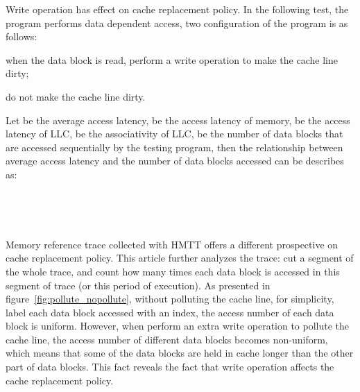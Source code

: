 \documentclass[conference]{IEEEtran}
\begin{document}
Write operation has effect on cache replacement policy. In the following test, the program performs data dependent access, two configuration of the program is as follows:
\begin{inparaenum}[(1)]
\item when the data block is read, perform a write operation to make the cache line dirty;
\item do not make the cache line dirty.
\end{inparaenum}

Let  be the average access latency,  be the access latency of memory,  be the access latency of LLC,  be the associativity of LLC,  be the number of data blocks that are accessed sequentially by the testing program, then the relationship between average access latency and the number of data blocks accessed can be describes as:

\begin{figure*}
\centering
	~
	~
	~
	~
	~

	~
	\caption{When test program performs data dependent access of different number of data blocks, the access number distribution of different data blocks in a period of time.}
	\label{fig:pollute_nopollute}
\end{figure*}
Memory reference trace collected with HMTT offers a different prospective on cache replacement policy. This article further analyzes the trace: cut a segment of the whole trace, and count how many times each data block is accessed in this segment of trace (or this period of execution). As presented in figure~\ref{fig:pollute_nopollute}, without polluting the cache line, for simplicity, label each data block accessed with an index, the access number of each data block is uniform. However, when perform an extra write operation to pollute the cache line, the access number of different data blocks becomes non-uniform, which means that some of the data blocks are held in cache longer than the other part of data blocks. This fact reveals the fact that write operation affects the cache replacement policy. 
\end{document}
